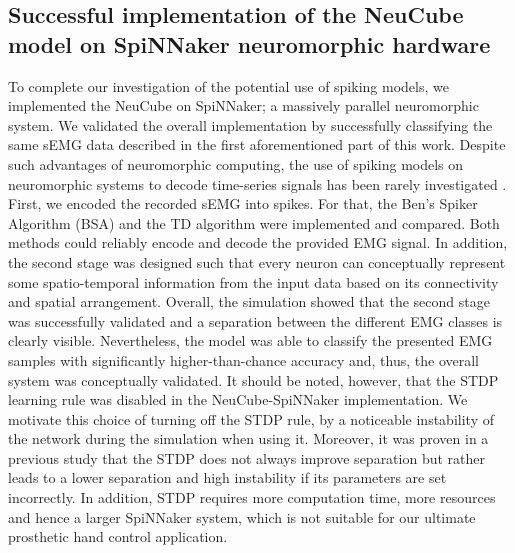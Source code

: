 \documentclass[journal,article,submit,moreauthors,pdftex,10pt,a4paper]{Definitions/mdpi}
\begin{document}
\subsection{Successful implementation of the NeuCube model on SpiNNaker neuromorphic hardware}
To complete our investigation of the potential use of spiking models, we implemented the NeuCube on SpiNNaker; a massively parallel neuromorphic system. We validated the overall implementation by successfully classifying the same sEMG data described in the first aforementioned part of this work. Despite such advantages of neuromorphic computing, the use of spiking models on neuromorphic systems to decode time-series signals has been rarely investigated \cite{31, 49}.
First, we encoded the recorded sEMG into spikes. For that, the Ben's Spiker Algorithm (BSA) \cite{37} and the TD algorithm were implemented and compared. Both methods could reliably encode and decode the provided EMG signal. 
In addition, the second stage was designed such that every neuron can conceptually represent some spatio-temporal information from the input data based on its connectivity and spatial arrangement. Overall, the simulation showed that the second stage was successfully validated and a separation between the different EMG classes is clearly visible. Nevertheless, the model was able to classify the presented EMG samples with significantly higher-than-chance accuracy and, thus, the overall system was conceptually validated. It should be noted, however, that the STDP learning rule was disabled in the NeuCube-SpiNNaker implementation. We motivate this choice of turning off the STDP rule,  by a noticeable instability of the network during the simulation when using it. Moreover, it was proven in a previous study \cite{50} that the STDP does not always improve separation but rather leads to a lower separation and high instability if its parameters are set incorrectly. In addition, STDP requires more computation time, more resources and hence a larger SpiNNaker system, which is not suitable for our ultimate prosthetic hand control application.
\end{document}

